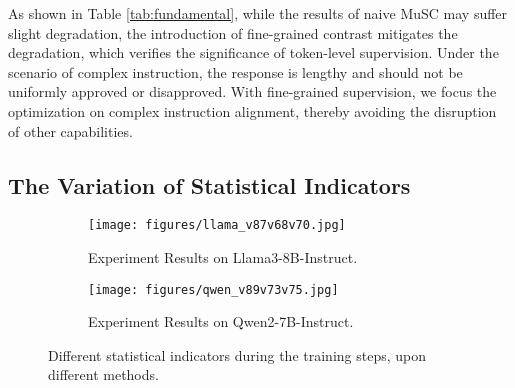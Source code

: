 
As shown in Table \ref{tab:fundamental}, while the results of naive MuSC may suffer slight degradation, the introduction of fine-grained contrast mitigates the degradation, which verifies the significance of token-level supervision. Under the scenario of complex instruction, the response is lengthy and should not be uniformly approved or disapproved. With fine-grained supervision, we focus the optimization on complex instruction alignment, thereby avoiding the disruption of other capabilities.

\subsection{The Variation of Statistical Indicators}

\begin{figure}[t]
\centering
\begin{subfigure}{0.48\textwidth}
    \texttt{[image: figures/llama\_v87v68v70.jpg]}
    \caption{Experiment Results on Llama3-8B-Instruct.}
    \label{fig:first}
\end{subfigure}
\hfill
\begin{subfigure}{0.48\textwidth}
    \texttt{[image: figures/qwen\_v89v73v75.jpg]}
    \caption{Experiment Results on Qwen2-7B-Instruct.}
    \label{fig:second}
\end{subfigure}        
\caption{Different statistical indicators during the training steps, upon different methods.}
\label{fig:indicator}
\end{figure}

